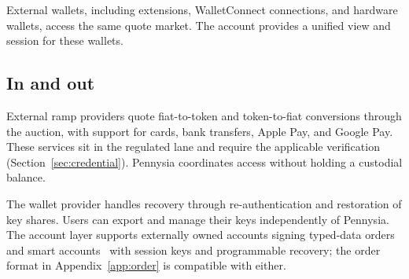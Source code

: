 External wallets, including extensions, WalletConnect connections, and hardware wallets, access the same quote market. The account provides a unified view and session for these wallets.

\subsection{In and out}

External ramp providers quote fiat-to-token and token-to-fiat conversions through the auction, with support for cards, bank transfers, Apple Pay, and Google Pay. These services sit in the regulated lane and require the applicable verification (Section~\ref{sec:credential}). Pennysia coordinates access without holding a custodial balance.

The wallet provider handles recovery through re-authentication and restoration of key shares. Users can export and manage their keys independently of Pennysia. The account layer supports externally owned accounts signing typed-data orders~\cite{eip712} and smart accounts~\cite{erc4337,eip7702} with session keys and programmable recovery; the order format in Appendix~\ref{app:order} is compatible with either.
